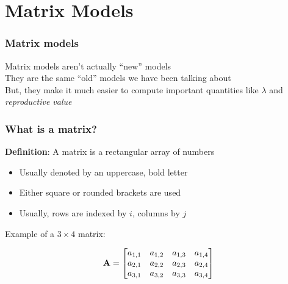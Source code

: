 \documentclass[color=usenames,dvipsnames]{beamer}\usepackage[]{graphicx}\usepackage[]{color}
\begin{document}











\section{Matrix Models}



\begin{frame}
  \frametitle{Matrix models}
  \Large
  Matrix models aren't actually ``new'' models \\
  \pause
  \vfill
  They are the same ``old'' models we have been talking about \\
  \pause
  \vfill
  But, they make it much easier to compute important
  quantities like $\lambda$ and {\it reproductive value} \\
\end{frame}



\begin{frame}
  \frametitle{What is a matrix?}
  {\bf Definition}: A matrix is a rectangular array of numbers
  \begin{itemize}
    \item Usually denoted by an uppercase, bold letter
    \item Either square or rounded brackets are used
    \item Usually, rows are indexed by $i$, columns by $j$
  \end{itemize}
  \pause

  \vspace{1cm}
  Example of a $3 \times 4$ matrix: \par
  \begin{center}
    \Large
    \[
    { \bf A} =
    \begin{bmatrix}
      a_{1,1} & a_{1,2} & a_{1,3} & a_{1,4} \\
      a_{2,1} & a_{2,2} & a_{2,3} & a_{2,4} \\
      a_{3,1} & a_{3,2} & a_{3,3} & a_{3,4}
    \end{bmatrix}
    \]
  \end{center}
\end{frame}
\end{document}
